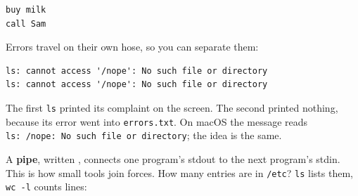 \begin{codeblock}
\begin{Verbatim}[formatcom=\outputstyle]
buy milk
call Sam
\end{Verbatim}
\end{codeblock}


Errors travel on their own hose, so you can separate them:

\begin{codeblock}

\begin{Shaded}
\begin{Highlighting}[]
\OperatorTok{\textgreater{}}
\end{Highlighting}
\end{Shaded}

\end{codeblock}

\begin{codeblock}
\begin{Verbatim}[formatcom=\outputstyle]
ls: cannot access '/nope': No such file or directory
ls: cannot access '/nope': No such file or directory
\end{Verbatim}
\end{codeblock}

The first \texttt{ls} printed its complaint on the screen. The second printed nothing, because its error went into \texttt{errors.txt}. On macOS the message reads \texttt{ls:}\allowbreak{}\texttt{\ /}\allowbreak{}\texttt{nope:}\allowbreak{}\texttt{\ No\ such\ file\ or\ directory}; the idea is the same.


A \textbf{pipe}, written \texttt{\textbar{}}, connects one program's stdout to the next program's stdin. This is how small tools join forces. How many entries are in \texttt{/etc}? \texttt{ls} lists them, \texttt{wc\ -l} counts lines:

\begin{codeblock}

\begin{Shaded}
\begin{Highlighting}[]
\KeywordTok{|}  
\end{Highlighting}
\end{Shaded}

\end{codeblock}


